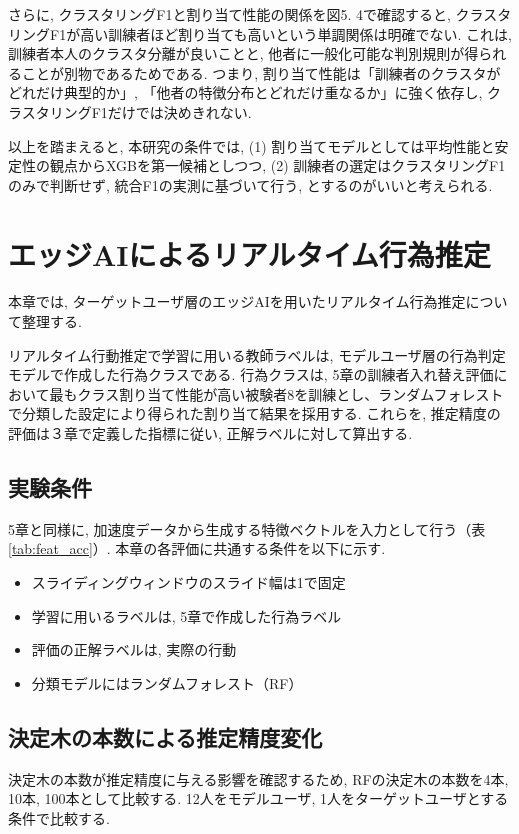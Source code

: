 \documentclass[a4paper,12pt]{jreport}
\begin{document}
さらに, クラスタリングF1と割り当て性能の関係を図5. 4で確認すると, クラスタリングF1が高い訓練者ほど割り当ても高いという単調関係は明確でない. これは, 訓練者本人のクラスタ分離が良いことと, 他者に一般化可能な判別規則が得られることが別物であるためである. つまり, 割り当て性能は「訓練者のクラスタがどれだけ典型的か」, 「他者の特徴分布とどれだけ重なるか」に強く依存し, クラスタリングF1だけでは決めきれない. 

以上を踏まえると, 本研究の条件では, (1) 割り当てモデルとしては平均性能と安定性の観点からXGBを第一候補としつつ, (2) 訓練者の選定はクラスタリングF1のみで判断せず, 統合F1の実測に基づいて行う, とするのがいいと考えられる. 



\chapter{エッジAIによるリアルタイム行為推定}
本章では,  ターゲットユーザ層のエッジAIを用いたリアルタイム行為推定について整理する. 

リアルタイム行動推定で学習に用いる教師ラベルは,  モデルユーザ層の行為判定モデルで作成した行為クラスである. 行為クラスは, 5章の訓練者入れ替え評価において最もクラス割り当て性能が高い被験者8を訓練とし、ランダムフォレストで分類した設定により得られた割り当て結果を採用する. これらを, 推定精度の評価は３章で定義した指標に従い, 正解ラベルに対して算出する. 

\section{実験条件}
5章と同様に, 加速度データから生成する特徴ベクトルを入力として行う（表\ref{tab:feat_acc}）. 本章の各評価に共通する条件を以下に示す.  
\begin{itemize}
    \item スライディングウィンドウのスライド幅は1で固定
    \item 学習に用いるラベルは, 5章で作成した行為ラベル
    \item 評価の正解ラベルは, 実際の行動
    \item 分類モデルにはランダムフォレスト（RF）
\end{itemize}



\section{決定木の本数による推定精度変化}
決定木の本数が推定精度に与える影響を確認するため, RFの決定木の本数を4本, 10本, 100本として比較する. 12人をモデルユーザ, 1人をターゲットユーザとする条件で比較する.
\end{document}
